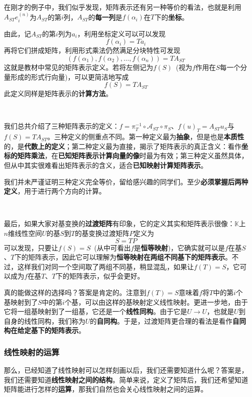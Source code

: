 \documentclass[a4paper,UTF8,fontset=windows,AutoFakeBold]{ctexart}
\newcommand*{\ma}{\mathcal{A}}
\newcommand*{\note}{\noindent *}
\begin{document}
在刚才的例子中，我们似乎发现，矩阵表示还有另一种等价的看法，也就是利用$A_{ST}e_i^{(n)}$为$A_{ST}$的第$i$列，$A_{ST}$的\textbf{每一列}是$f(\alpha_i)$在$T$下的\textbf{坐标}。

由此，记$A_{ST}$的第$i$列为$a_i$，利用坐标定义可以可以发现
$$f(\alpha_i)=Ta_i$$
再将它们拼成矩阵，利用形式乘法仍然满足分块特性可发现
$$(f(\alpha_1),f(\alpha_2),\dots,f(\alpha_n))=TA_{ST}$$
这就是教材中常见的矩阵表示定义。若将左侧记为$f(S)$\ (视为$f$作用在$S$每一个分量形成的形式行向量)，可以更简洁地写成
$$f(S)=TA_{ST}$$
此定义同样是矩阵表示的\textbf{计算方法}。

\

我们总共介绍了三种矩阵表示的定义：$f=\pi_T^{-1}\circ\ma_{ST}\circ\pi_S$、$f(u)_T=A_{ST}u_S$与$f(S)=TA_{ST}$。三种定义的侧重点不同。第一种定义最为\textbf{抽象}，但是也是\textbf{本质性}的，是\textbf{代数上的定义}；第二种定义最为直接，揭示了矩阵表示的真正含义：看作\textbf{坐标的矩阵乘法}，在\textbf{已知矩阵表示计算向量的像}时最为有效；第三种定义虽然具体，但从中其实很难看出矩阵表示的含义，适合\textbf{已知映射计算矩阵表示}。

\note 我们并未严谨证明三种定义完全等价，留给感兴趣的同学们。至少\textbf{必须掌握后两种定义}，用于进行两个方向的计算。

\

最后，如果大家对基变换的\textbf{过渡矩阵}有印象，它的定义其实和矩阵表示很像：$\mathbb{K}$上$n$维线性空间$U$的基$S$到$T$的基变换过渡矩阵$P$定义为
$$S=TP$$
可以发现，只要让$f(S)=S$\ (从中可看出$f$是\textbf{恒等映射})，它确实就可以是$f$在基$S$、$T$下的矩阵表示，因此它可以理解为\textbf{恒等映射在两组不同基下的矩阵表示}。不过，这样我们对同一个空间取了两组不同基，稍显混乱，如果让$f(T)=S$，它可以成为$f$在基$T$、$T$下的矩阵表示，似乎会更好。

真的能做这样的选择吗？答案是肯定的。注意到$f(T)=S$意味着$f$将$T$中的第$i$个基映射到了$S$中的第$i$个基，可以由这样的基映射定义线性映射。更进一步地，由于它将一组基映射到了一组基，它还是一个\textbf{线性同构}。由于它是$U\to U$，也就是$U$到自身的线性同构，我们称为$U$的\textbf{自同构}。于是，过渡矩阵更合理的看法是看作\textbf{自同构在给定基下的矩阵表示}。

\subsubsection{线性映射的运算}
那么，已经知道了线性映射可以怎样刻画以后，我们还需要知道什么呢？答案是，我们还需要知道\textbf{线性映射之间的结构}。简单来说，定义了矩阵后，我们还希望知道矩阵能进行怎样的\textbf{运算}，那我们自然也会关心线性映射之间的运算。
\end{document}
